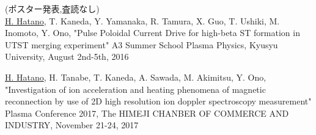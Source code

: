 \renewcommand{\bibname}{発表業績}
\begin{thebibliography}{99}

\makeatletter
\@newlistfalse
\makeatother


(ポスター発表,査読なし)
\\

\underline{H. Hatano}, T. Kaneda, Y. Yamanaka, R. Tamura, X. Guo, T. Ushiki, M. Inomoto, Y. Ono, "Pulse Poloidal Current Drive for high-beta ST formation in UTST merging experiment" A3 Summer School Plasma Physics, Kyusyu University, August 2nd-5th, 2016

	\underline{H. Hatano}, H. Tanabe, T. Kaneda, A. Sawada, M. Akimitsu, Y. Ono, "Investigation of ion acceleration and heating phenomena of magnetic reconnection by use of 2D high resolution ion doppler spectroscopy measurement" Plasma Conference 2017, The HIMEJI CHANBER OF COMMERCE AND INDUSTRY, November 21-24, 2017

	
\end{thebibliography}